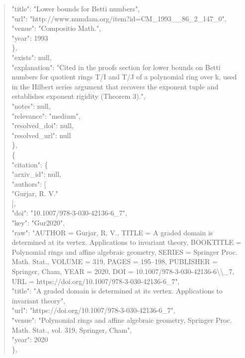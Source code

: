 \documentclass[11pt]{article}
\begin{document}
\begin{quote}
        "title": "Lower bounds for Betti numbers",\\
        "url": "http://www.numdam.org/item?id=CM\_1993\_\_86\_2\_147\_0",\\
        "venue": "Compositio Math.",\\
        "year": 1993\\
      \},\\
      "exists": null,\\
      "explanation": "Cited in the proofs section for lower bounds on Betti numbers for quotient rings T/I and T/J of a polynomial ring over k, used in the Hilbert series argument that recovers the exponent tuple and establishes exponent rigidity (Theorem 3).",\\
      "notes": null,\\
      "relevance": "medium",\\
      "resolved\_doi": null,\\
      "resolved\_url": null\\
    \},\\
    \{\\
      "citation": \{\\
        "arxiv\_id": null,\\
        "authors": [\\
          "Gurjar, R. V."\\
        ],\\
        "doi": "10.1007/978-3-030-42136-6\_7",\\
        "key": "Gur2020",\\
        "raw": "AUTHOR = Gurjar, R. V., TITLE = A graded domain is determined at its vertex. Applications to invariant theory, BOOKTITLE = Polynomial rings and affine algebraic geometry, SERIES = Springer Proc. Math. Stat., VOLUME = 319, PAGES = 195--198, PUBLISHER = Springer, Cham, YEAR = 2020, DOI = 10.1007/978-3-030-42136-6\textbackslash{}\textbackslash{}\_7, URL = https://doi.org/10.1007/978-3-030-42136-6\_7",\\
        "title": "A graded domain is determined at its vertex. Applications to invariant theory",\\
        "url": "https://doi.org/10.1007/978-3-030-42136-6\_7",\\
        "venue": "Polynomial rings and affine algebraic geometry, Springer Proc. Math. Stat., vol. 319, Springer, Cham",\\
        "year": 2020\\
      \},\\

\end{quote}
\end{document}
